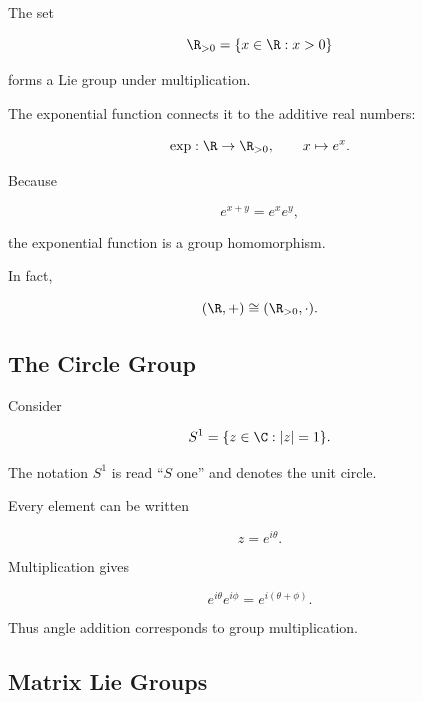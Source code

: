 The set

\[ \R_{>0}=\{x\in\R:x>0\} \]

forms a Lie group under multiplication.

The exponential function connects it to the additive real numbers:

\[ \exp:\R\to\R_{>0},\qquad x\mapsto e^x. \]

Because

\[ e^{x+y}=e^xe^y, \]

the exponential function is a group homomorphism.

In fact,

\[ (\R,+)\cong(\R_{>0},\cdot). \]

\subsection{The Circle Group}
\label{subsec:circle-group}

Consider

\[ S^1=\{z\in\C:|z|=1\}. \]

The notation \(S^1\) is read ``\(S\) one'' and denotes the unit circle.

Every element can be written

\[ z=e^{i\theta}. \]

Multiplication gives

\[ e^{i\theta}e^{i\phi}=e^{i(\theta+\phi)}. \]

Thus angle addition corresponds to group multiplication.

\begin{center}
\end{center}

\subsection{Matrix Lie Groups}
\label{subsec:matrix-lie-groups}

